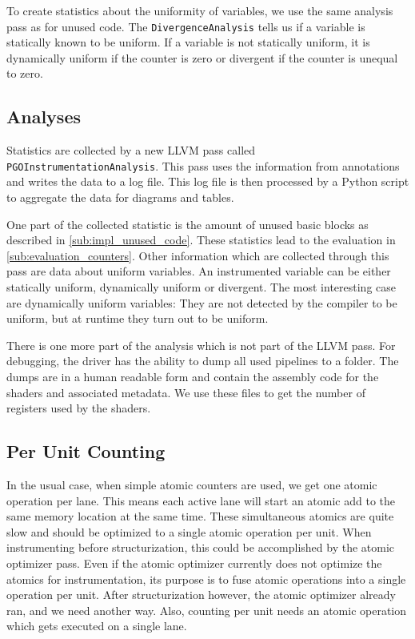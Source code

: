 To create statistics about the uniformity of variables, we use the same analysis pass as for unused code.
The \texttt{DivergenceAnalysis} tells us if a variable is statically known to be uniform.
If a variable is not statically uniform, it is dynamically uniform if the counter is zero or divergent if the counter is unequal to zero.

\subsection{Analyses}
\label{sub:impl_analysis}
Statistics are collected by a new LLVM pass called \texttt{PGOInstrumentationAnalysis}.
This pass uses the information from annotations and writes the data to a log file.
This log file is then processed by a Python script to aggregate the data for diagrams and tables.

One part of the collected statistic is the amount of unused basic blocks as described in \cref{sub:impl_unused_code}.
These statistics lead to the evaluation in \cref{sub:evaluation_counters}.
Other information which are collected through this pass are data about uniform variables.
An instrumented variable can be either statically uniform, dynamically uniform or divergent.
The most interesting case are dynamically uniform variables: They are not detected by the compiler to be uniform, but at runtime they turn out to be uniform.

There is one more part of the analysis which is not part of the LLVM pass.
For debugging, the driver has the ability to dump all used pipelines to a folder.
The dumps are in a human readable form and contain the assembly code for the shaders and associated metadata.
We use these files to get the number of registers used by the shaders.

\subsection{Per Unit Counting}
\label{sub:impl_per_unit}
In the usual case, when simple atomic counters are used, we get one atomic operation per lane.
This means each active lane will start an atomic add to the same memory location at the same time.
These simultaneous atomics are quite slow and should be optimized to a single atomic operation per unit.
When instrumenting before structurization, this could be accomplished by the atomic optimizer pass.
Even if the atomic optimizer currently does not optimize the atomics for instrumentation, its purpose is to fuse atomic operations into a single operation per unit.
After structurization however, the atomic optimizer already ran, and we need another way.
Also, counting per unit needs an atomic operation which gets executed on a single lane.

